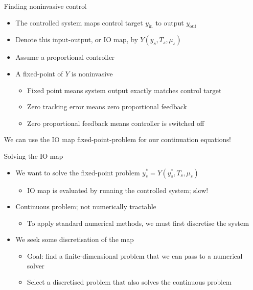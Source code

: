 \documentclass[presentation]{beamer}
\begin{document}
\begin{frame}[label={sec:orgec896d5}]{Finding noninvasive control}
\begin{itemize}
\item The controlled system maps control target \(y_\text{in}\) to output \(y_\text{out}\)
\end{itemize}
\vfill
\begin{itemize}
\item Denote this input-output, or IO map, by \(Y(y_s, T_s, \mu_s)\)
\end{itemize}
\vfill
\begin{itemize}
\item Assume a proportional controller
\end{itemize}
\vfill
\begin{itemize}
\item A fixed-point of \(Y\) is noninvasive
\begin{itemize}
\item Fixed point means system output exactly matches control target
\item Zero tracking error means zero proportional feedback
\item Zero proportional feedback means controller is switched off
\end{itemize}
\end{itemize}
\vfill
We can use the IO map fixed-point-problem for our continuation equations!
\end{frame}

\begin{frame}[label={sec:orgd76f1a1}]{Solving the IO map}
\begin{itemize}
\item We want to solve the fixed-point problem \(y^*_s = Y(y^*_s, T_s, \mu_s)\)
\begin{itemize}
\item IO map is evaluated by running the controlled system; slow!
\end{itemize}
\end{itemize}
\vfill
\begin{itemize}
\item Continuous problem; not numerically tractable
\begin{itemize}
\item To apply standard numerical methods, we must first discretise the system
\end{itemize}
\end{itemize}
\vfill
\begin{itemize}
\item We seek some discretisation of the map
\begin{itemize}
\item Goal: find a finite-dimensional problem that we can pass to a numerical solver
\item Select a discretised problem that also solves the continuous problem
\end{itemize}
\end{itemize}
\end{frame}
\end{document}
